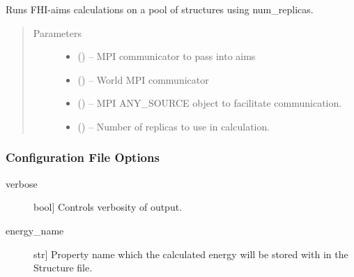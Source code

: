 \documentclass[letterpaper,10pt,english]{sphinxmanual}
\begin{document}
\begin{fulllineitems}
\begin{fulllineitems}
\begin{quote}
\begin{description}
\end{description}\end{quote}

\end{fulllineitems}


\begin{fulllineitems}
\label{\detokenize{index:Genarris.genarris_master.Genarris.Run_FHI_Aims_Batch}}
Runs FHI-aims calculations on a pool of structures using num\_replicas.
\begin{quote}\begin{description}
\item[{Parameters}] \leavevmode\begin{itemize}
\item {} 
 () -- MPI communicator to pass into aims

\item {} 
 () -- World MPI communicator

\item {} 
 () -- MPI ANY\_SOURCE object to facilitate communication.

\item {} 
 () -- Number of replicas to use in calculation.

\end{itemize}

\end{description}\end{quote}
\subsubsection*{Configuration File Options}
\begin{description}
\item[{verbose}] \leavevmode{[}bool{]}
Controls verbosity of output.

\item[{energy\_name}] \leavevmode{[}str{]}
Property name which the calculated energy will be stored with in the
Structure file.


\end{description}
\end{fulllineitems}
\end{fulllineitems}
\end{document}
